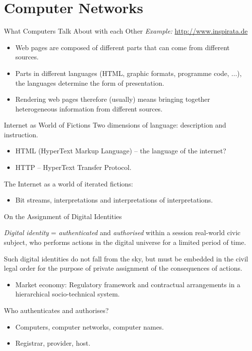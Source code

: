 \documentclass{beamer}
\begin{document}
\section{Computer Networks}
\begin{frame}{What Computers Talk About with each Other}
\emph{Example:} \url{http://www.inspirata.de} 
\begin{itemize}
\item Web pages are composed of different parts that can come from different
  sources.
\item Parts in different languages (HTML, graphic formats, programme code,
  ...), the languages determine the form of presentation.
\item Rendering web pages therefore (usually) means bringing together
  heterogeneous information from different sources.
\end{itemize}
\end{frame}
\begin{frame}{Internet as World of Fictions}
Two dimensions of language: description and instruction.
\begin{itemize}
\item HTML (HyperText Markup Language) -- the language of the internet? 
\item HTTP -- HyperText Transfer Protocol.
\end{itemize}
The Internet as a world of iterated fictions: 
\begin{itemize}
\item Bit streams, interpretations and interpretations of interpretations.
\end{itemize}
\end{frame}
\begin{frame}{On the Assignment of Digital Identities}

\emph{Digital identity} = \emph{authenticated} and \emph{authorised} within a
session real-world civic subject, who performs actions in the digital universe
for a limited period of time.

Such digital identities do not fall from the sky, but must be embedded in the
civil legal order for the purpose of private assignment of the consequences of
actions.
\begin{itemize}
\item Market economy: Regulatory framework and contractual arrangements in a
  hierarchical socio-technical system.
\end{itemize}
Who authenticates and authorises? 
\begin{itemize}
\item Computers, computer networks, computer names.
\item Registrar, provider, host.
\end{itemize}
\end{frame}
\end{document}

